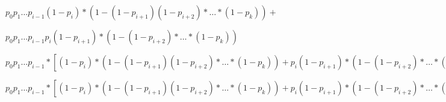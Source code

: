 \documentclass[fleqn]{article}
\begin{document}
$p_0p_1\dots p_{i-1} (1 - p_i) * (1 - (1-p_{i+1})(1-p_{i+2})*\dots*(1-p_k)) + $ \newline

$p_0p_1\dots p_{i-1} p_i (1 - p_{i+1}) * (1 - (1-p_{i+2})*\dots*(1-p_k))$ \newline

$p_0p_1\dots p_{i-1} * [ (1 - p_i) * (1 - (1-p_{i+1})(1-p_{i+2})*\dots*(1-p_k)) + p_i (1 - p_{i+1}) * (1 - (1-p_{i+2})*\dots*(1-p_k)) ] $ \newline

$p_0p_1\dots p_{i-1} * [ (1 - p_i) * (1 - (1-p_{i+1})(1-p_{i+2})*\dots*(1-p_k)) + p_i (1 - p_{i+1}) * (1 - (1-p_{i+2})*\dots*(1-p_k)) ] $
\end{document}

